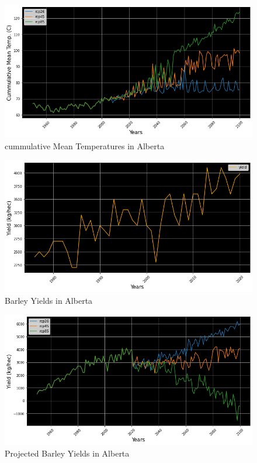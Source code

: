 \documentclass[11pt]{article}
\numberwithin{equation}{section}
\begin{document}
\begin{figure}[h!]
\centering
 \includegraphics[scale=0.4]{ABtemp}
 \caption{cummulative Mean Temperatures in Alberta}
 \label{ABmeantemp}
\end{figure}

\begin{figure}[h!]
\centering
 \includegraphics[scale=0.4]{AByield}
 \caption{Barley Yields in Alberta}
 \label{ABbarleyyields}
\end{figure}

\begin{figure}[h!]
 \centering
 \includegraphics[scale=0.4]{ABproj}
 \caption{Projected Barley Yields in Alberta}
 \label{ABprojections}
\end{figure}
\end{document}
